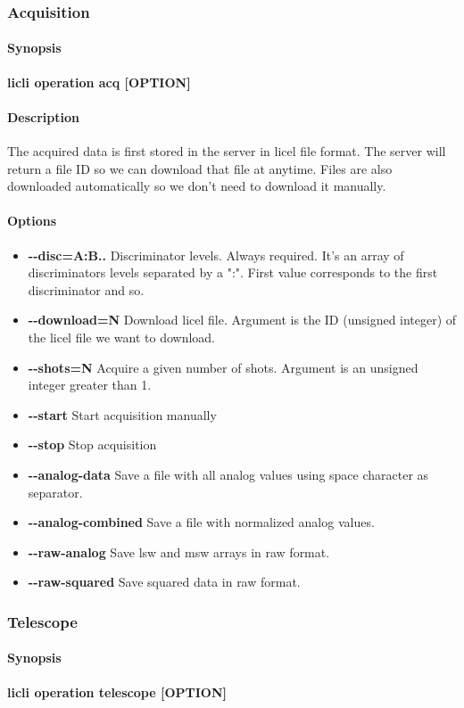 \documentclass[letterpaper, 10 pt]{article}
\newcommand{\cmdsection}[1]{\paragraph{#1}\mbox{}\par}
\begin{document}
\subsubsection{Acquisition}
\cmdsection{Synopsis} \textbf{licli operation acq [OPTION]}\\

\cmdsection{Description} The acquired data is first stored in the server in licel file format. The server will return a file ID so we can download that file at anytime. Files are also downloaded automatically so we don't need to download it manually.\\
\cmdsection{Options}
\begin{itemize}
	\item[] \textbf{-{}-disc=A:B..} Discriminator levels. Always required. It's an array of discriminators levels separated by a ":". First value corresponds to the first discriminator and so.
	\item[] \textbf{-{}-download=N} Download licel file. Argument is the ID (unsigned integer) of the licel file we want to download.
	\item[] \textbf{-{}-shots=N} Acquire a given number of shots. Argument is an unsigned integer greater than 1. 
	\item[] \textbf{-{}-start} Start acquisition manually
	\item[] \textbf{-{}-stop} Stop acquisition
	\item[] \textbf{-{}-analog-data} Save a file with all analog values using space character as separator.
	\item[] \textbf{-{}-analog-combined} Save a file with normalized analog values.
	\item[] \textbf{-{}-raw-analog} Save lsw and msw arrays in raw format.
	\item[] \textbf{-{}-raw-squared} Save squared data in raw format.
\end{itemize}
\subsubsection{Telescope}
\cmdsection{Synopsis} \textbf{licli operation telescope [OPTION]}\\
\end{document}
